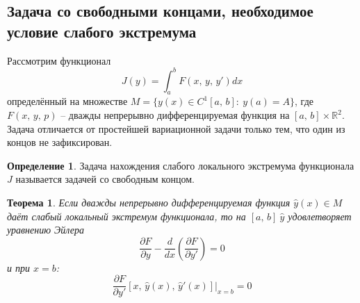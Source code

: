 \documentclass[a4paper,12pt]{article}
\theoremstyle{plain}
\newtheorem{theorem}{Теорема}[section]
\theoremstyle{definition}
\newtheorem{definition}{Определение}[section]
\theoremstyle{remark}
\begin{document}
\subsection{Задача со свободными концами, необходимое условие слабого экстремума}
Рассмотрим функционал
\[J(y) = \int_a^b F(x,\,y,\,y')dx\]
определённый на множестве $M = \{y(x) \in C^1[a,\,b]:\: y(a) = A\}$, где $F(x,\,y,\,p)$ -- дважды непрерывно дифференцируемая функция на $[a,\,b] \times \mathbb{R}^2$. Задача отличается от простейшей вариационной задачи только тем, что один из концов не зафиксирован.

\begin{definition}
	Задача нахождения слабого локального экстремума функционала $J$ называется задачей со свободным концом.
\end{definition}

\begin{theorem}
	Если дважды непрерывно дифференцируемая функция $\hat{y}(x) \in M$ даёт слабый локальный экстремум функционала, то на $[a,\,b]\: \hat{y}$ удовлетворяет уравнению Эйлера
	\[\frac{\partial F}{\partial y} - \frac{d}{dx}\left(\frac{\partial F}{\partial y'}\right) = 0\]
	и при $x = b$:
	\[\frac{\partial F}{\partial y'}[x,\,\hat{y}(x),\, \hat{y}'(x)]|_{x = b} = 0\]
\end{theorem}
\end{document}
